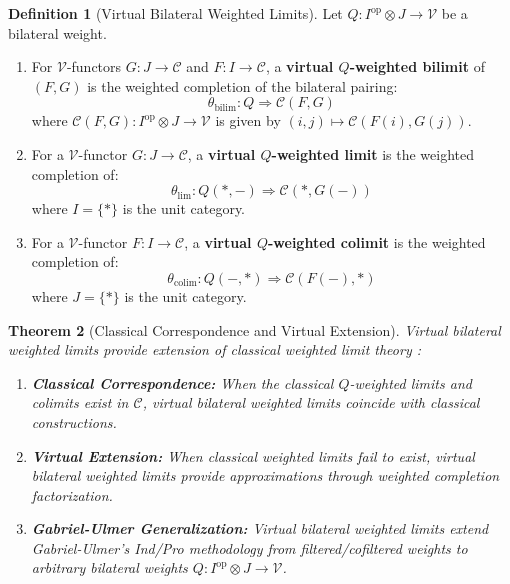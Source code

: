 \documentclass[11pt]{article}
\theoremstyle{plain}
\newtheorem{theorem}{Theorem}[section]
\theoremstyle{definition}
\newtheorem{definition}[theorem]{Definition}
\theoremstyle{remark}
\newcommand{\V}{\mathcal{V}}
\newcommand{\C}{\mathcal{C}}
\newcommand{\op}{\mathrm{op}}
\newcommand{\colim}{\mathrm{colim}}
\renewcommand{\lim}{\mathrm{lim}}
\begin{document}
\begin{definition}[Virtual Bilateral Weighted Limits]\label{def:virtual-limits}
Let $Q : I^{\op} \otimes J \to \V$ be a bilateral weight.

\begin{enumerate}
\item For $\V$-functors $G : J \to \C$ and $F : I \to \C$, a \textbf{virtual $Q$-weighted bilimit} of $(F, G)$ is the weighted completion of the bilateral pairing:
$$\theta_{\mathrm{bilim}} : Q \Rightarrow \C(F, G)$$
where $\C(F, G) : I^{\op} \otimes J \to \V$ is given by $(i, j) \mapsto \C(F(i), G(j))$.

\item For a $\V$-functor $G : J \to \C$, a \textbf{virtual $Q$-weighted limit} is the weighted completion of:
$$\theta_{\lim} : Q(\ast, -) \Rightarrow \C(\ast, G(-))$$
where $I = \{\ast\}$ is the unit category.

\item For a $\V$-functor $F : I \to \C$, a \textbf{virtual $Q$-weighted colimit} is the weighted completion of:
$$\theta_{\colim} : Q(-, \ast) \Rightarrow \C(F(-), \ast)$$
where $J = \{\ast\}$ is the unit category.
\end{enumerate}
\end{definition}

\begin{theorem}[Classical Correspondence and Virtual Extension]\label{thm:virtual-correspondence}
Virtual bilateral weighted limits provide extension of classical weighted limit theory \cite{riehl2008weighted,kelly1982basic}:

\begin{enumerate}
\item \textbf{Classical Correspondence:} When the classical $Q$-weighted limits and colimits exist in $\C$, virtual bilateral weighted limits coincide with classical constructions.

\item \textbf{Virtual Extension:} When classical weighted limits fail to exist, virtual bilateral weighted limits provide approximations through weighted completion factorization.

\item \textbf{Gabriel-Ulmer Generalization:} Virtual bilateral weighted limits extend Gabriel-Ulmer's Ind/Pro methodology \cite{gabriel1971lokal} from filtered/cofiltered weights to arbitrary bilateral weights $Q : I^{\op} \otimes J \to \V$.
\end{enumerate}
\end{theorem}
\end{document}

